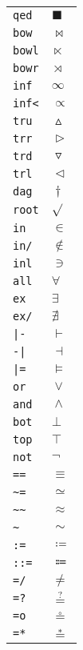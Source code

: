 \begin{longtable}{ll}
\texttt{qed}&${}\blacksquare {}$\\
\texttt{bow}&${}\bowtie {}$\\
\texttt{bowl}&${}\ltimes {}$\\
\texttt{bowr}&${}\rtimes {}$\\
\texttt{inf}&${}\infty {}$\\
\texttt{inf<}&${}\propto {}$\\
\texttt{tru}&${}\vartriangle {}$\\
\texttt{trr}&${}\vartriangleright {}$\\
\texttt{trd}&${}\triangledown {}$\\
\texttt{trl}&${}\vartriangleleft {}$\\
\texttt{dag}&${}\dagger {}$\\
\texttt{root}&${}\sqrt {}$\\
\texttt{in}&${}\in {}$\\
\texttt{in/}&${}\notin {}$\\
\texttt{inl}&${}\ni {}$\\
\texttt{all}&${}\forall {}$\\
\texttt{ex}&${}\exists {}$\\
\texttt{ex/}&${}\nexists {}$\\
\texttt{|{-}}&${}\vdash {}$\\
\texttt{{-}|}&${}\dashv {}$\\
\texttt{|=}&${}\models {}$\\
\texttt{or}&${}\vee {}$\\
\texttt{and}&${}\wedge {}$\\
\texttt{bot}&${}\bot {}$\\
\texttt{top}&${}\top {}$\\
\texttt{not}&${}\neg {}$\\
\texttt{==}&${}\equiv {}$\\
\texttt{\textasciitilde =}&${}\simeq {}$\\
\texttt{\textasciitilde \textasciitilde }&${}\approx {}$\\
\texttt{\textasciitilde }&${}\sim {}$\\
\texttt{:=}&${}\coloneqq {}$\\
\texttt{::=}&${}\Coloneqq {}$\\
\texttt{=/}&${}\neq {}$\\
\texttt{=?}&${}\mathrel{\overset{?}{=}} {}$\\
\texttt{=o}&${}\mathrel{\overset{\circ}{=}} {}$\\
\texttt{=*}&${}\mathrel{\overset{*}{=}} {}$\\

\end{longtable}
